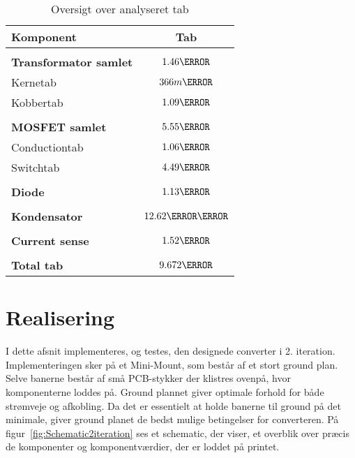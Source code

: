 \begin{table}[H] 			
	\centering
	\begin{tabularx}{\textwidth}{|X|c|}
		\hline
		\textbf{\large Komponent} & {\textbf{\large Tab}} \\ \hline
		& 	\\ \hline
		\textbf{Transformator samlet} & $1.46\watt$ \\ \hline 
		Kernetab & $366m\watt$ \\ \hline
		Kobbertab & $1.09\watt$ \\ \hline
		& 	\\ \hline
		\textbf{MOSFET samlet} & $5.55\watt$ \\ \hline
		Conductiontab & $1.06\watt$ \\ \hline
		Switchtab & $4.49\watt$ \\ \hline
		& 	\\ \hline
		\textbf{Diode} & $1.13\watt$ \\ \hline
		& 	\\ \hline
		\textbf{Kondensator} & $12.62\milli\watt$ \\ \hline
		& 	\\ \hline
			\textbf{Current sense} & $1.52\watt$ \\ \hline
		& 	\\ \hline
		\textbf{Total tab} & $9.672\watt$ \\ \hline
	\end{tabularx}
	\caption{Oversigt over analyseret tab}
	\label{tab:analyseret}
\end{table}



\clearpage 

\section{Realisering}

I dette afsnit implementeres, og testes, den designede converter i 2. iteration. Implementeringen sker på et Mini-Mount, som består af et stort ground plan. Selve banerne består af små PCB-stykker der klistres ovenpå, hvor komponenterne loddes på. Ground plannet giver optimale forhold for både strømveje og afkobling. Da det er essentielt at holde banerne til ground på det minimale, giver ground planet de bedst mulige betingelser for converteren. På figur~\ref{fig:Schematic2iteration} ses et schematic, der viser, et overblik over præcis de komponenter og komponentværdier, der er loddet på printet.

